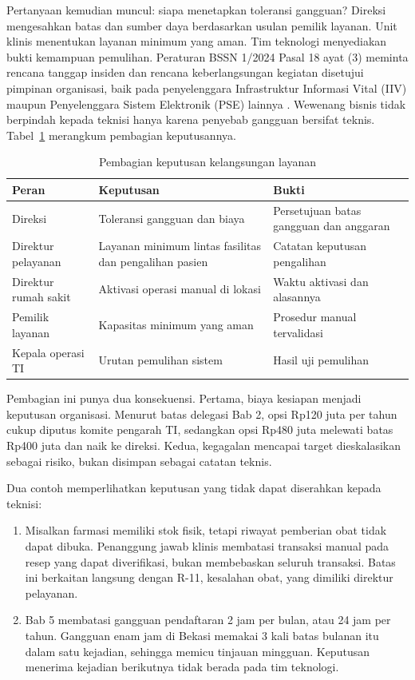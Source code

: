 Pertanyaan kemudian muncul: siapa menetapkan toleransi gangguan? Direksi mengesahkan batas dan
sumber daya berdasarkan usulan pemilik layanan. Unit klinis menentukan layanan minimum yang aman.
Tim teknologi menyediakan bukti kemampuan pemulihan. Peraturan BSSN 1/2024 Pasal 18 ayat (3)
meminta rencana tanggap insiden dan rencana keberlangsungan kegiatan disetujui pimpinan
organisasi, baik pada penyelenggara Infrastruktur Informasi Vital (IIV) maupun Penyelenggara
Sistem Elektronik (PSE) lainnya \cite{bssn1-2024}. Wewenang bisnis tidak berpindah kepada teknisi
hanya karena penyebab gangguan bersifat teknis. Tabel~\ref{tab:ch10-tanggung-jawab} merangkum
pembagian keputusannya.

\begin{table}[!htb]
  \centering\small
  \caption{Pembagian keputusan kelangsungan layanan}\label{tab:ch10-tanggung-jawab}
  \begin{tabularx}{\textwidth}{|>{\raggedright\arraybackslash}p{}|>{\raggedright\arraybackslash}X|>{\raggedright\arraybackslash}X|}
    \hline
    \textbf{Peran} & \textbf{Keputusan} & \textbf{Bukti} \\ \hline
    Direksi & Toleransi gangguan dan biaya & Persetujuan batas gangguan dan anggaran \\ \hline
    Direktur pelayanan & Layanan minimum lintas fasilitas dan pengalihan pasien & Catatan
    keputusan pengalihan \\ \hline
    Direktur rumah sakit & Aktivasi operasi manual di lokasi & Waktu aktivasi dan alasannya \\
    \hline
    Pemilik layanan & Kapasitas minimum yang aman & Prosedur manual tervalidasi \\ \hline
    Kepala operasi TI & Urutan pemulihan sistem & Hasil uji pemulihan \\ \hline
  \end{tabularx}
\end{table}

Pembagian ini punya dua konsekuensi. Pertama, biaya kesiapan menjadi keputusan organisasi.
Menurut batas delegasi Bab 2, opsi Rp120 juta per tahun cukup diputus komite pengarah TI,
sedangkan opsi Rp480 juta melewati batas Rp400 juta dan naik ke direksi. Kedua, kegagalan
mencapai target dieskalasikan sebagai risiko, bukan disimpan sebagai catatan teknis.

Dua contoh memperlihatkan keputusan yang tidak dapat diserahkan kepada teknisi:
\begin{enumerate}
  \item Misalkan farmasi memiliki stok fisik, tetapi riwayat pemberian obat tidak dapat dibuka.
  Penanggung jawab klinis membatasi transaksi manual pada resep yang dapat diverifikasi, bukan
  membebaskan seluruh transaksi. Batas ini berkaitan langsung dengan R-11, kesalahan obat, yang
  dimiliki direktur pelayanan.
  \item Bab 5 membatasi gangguan pendaftaran 2 jam per bulan, atau 24 jam per tahun. Gangguan
  enam jam di Bekasi memakai 3 kali batas bulanan itu dalam satu kejadian, sehingga memicu
  tinjauan mingguan. Keputusan menerima kejadian berikutnya tidak berada pada tim teknologi.
\end{enumerate}

